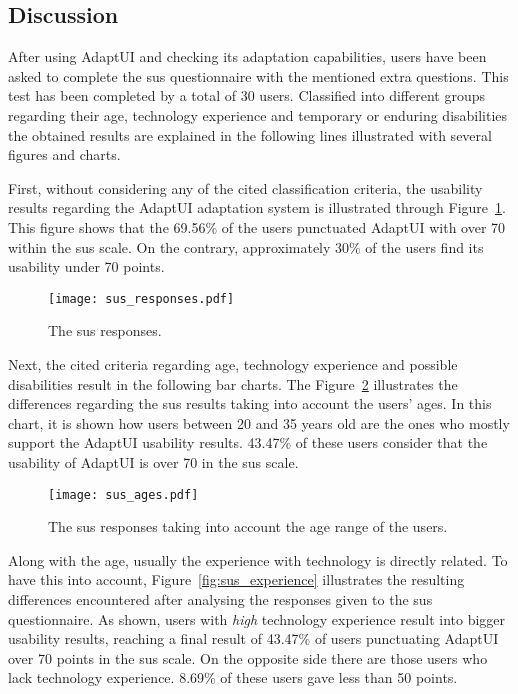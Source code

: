 \subsection{Discussion}
\label{sec:user_evaluation_discussion}

After using AdaptUI and checking its adaptation capabilities, users have been 
asked to complete the \ac{sus} questionnaire with the mentioned extra questions. 
This test has been completed by a total of 30 users. Classified into different 
groups regarding their age, technology experience and temporary or enduring 
disabilities the obtained results are explained in the following lines illustrated 
with several figures and charts.

First, without considering any of the cited classification criteria, the usability 
results regarding the AdaptUI adaptation system is illustrated through 
Figure~\ref{fig:sus_responses}. This figure shows that the 69.56\% of the users
punctuated AdaptUI with over 70 within the \ac{sus} scale. On the contrary, 
approximately 30\% of the users find its usability under 70 points.

\begin{figure}
\centering
\texttt{[image: sus\_responses.pdf]}
\caption{The \ac{sus} responses.}
\label{fig:sus_responses}
\end{figure}

Next, the cited criteria regarding age, technology experience and possible
disabilities result in the following bar charts. The Figure~\ref{fig:sus_age}
illustrates the differences regarding the \ac{sus} results taking into account the
users' ages. In this chart, it is shown how users between 20 and 35 years old
are the ones who mostly support the AdaptUI usability results. 43.47\% of
these users consider that the usability of AdaptUI is over 70 in the \ac{sus} scale.

\begin{figure}
\centering
\texttt{[image: sus\_ages.pdf]}
\caption{The \ac{sus} responses taking into account the age range of the users.}
\label{fig:sus_age}
\end{figure}

Along with the age, usually the experience with technology is directly related.
To have this into account, Figure~\ref{fig:sus_experience} illustrates the
resulting differences encountered after analysing the responses given to the \ac{sus}
questionnaire. As shown, users with \textit{high} technology experience 
result into bigger usability results, reaching a final result of 43.47\% of 
users punctuating AdaptUI over 70 points in the \ac{sus} scale. On the opposite side 
there are those users who lack technology experience. 8.69\% of these 
users gave less than 50 points. 

